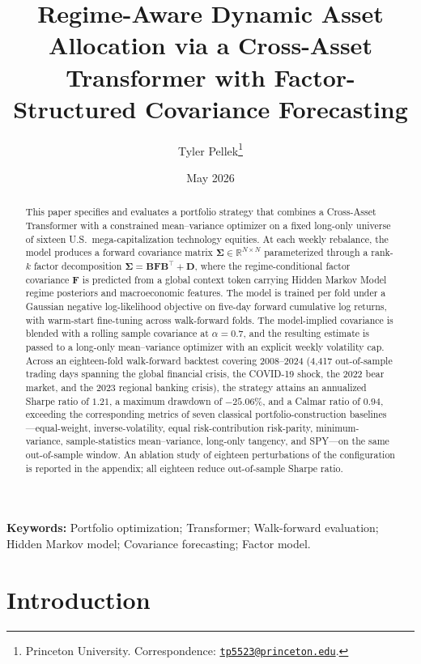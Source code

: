 \documentclass[11pt]{article}
\title{\bfseries Regime-Aware Dynamic Asset Allocation via a Cross-Asset Transformer with Factor-Structured Covariance Forecasting}
\author{Tyler Pellek\thanks{Princeton University. Correspondence: \href{mailto:tp5523@princeton.edu}{\texttt{tp5523@princeton.edu}}.}}
\date{May 2026}
\newcommand{\R}{\mathbb{R}}
\newcommand{\Sig}{\boldsymbol{\Sigma}}
\newcommand{\bB}{\mathbf{B}}
\newcommand{\bF}{\mathbf{F}}
\newcommand{\bD}{\mathbf{D}}
\begin{document}
\maketitle

\begin{abstract}
\noindent
This paper specifies and evaluates a portfolio strategy that combines a
Cross-Asset Transformer with a constrained mean--variance optimizer on a
fixed long-only universe of sixteen U.S.\ mega-capitalization technology
equities. At each weekly rebalance, the model produces a forward
covariance matrix $\Sig \in \R^{N \times N}$ parameterized through a
rank-$k$ factor decomposition $\Sig = \bB \bF \bB^\top + \bD$, where the
regime-conditional factor covariance $\bF$ is predicted from a global
context token carrying Hidden Markov Model regime posteriors and
macroeconomic features. The model is trained per fold under a Gaussian
negative log-likelihood objective on five-day forward cumulative log
returns, with warm-start fine-tuning across walk-forward folds. The
model-implied covariance is blended with a rolling sample covariance at
$\alpha = 0.7$, and the resulting estimate is passed to a long-only
mean--variance optimizer with an explicit weekly volatility cap. Across
an eighteen-fold walk-forward backtest covering 2008--2024 (4,417
out-of-sample trading days spanning the global financial crisis, the
COVID-19 shock, the 2022 bear market, and the 2023 regional banking
crisis), the strategy attains an annualized Sharpe ratio of $1.21$, a
maximum drawdown of $-25.06\%$, and a Calmar ratio of $0.94$, exceeding
the corresponding metrics of seven classical portfolio-construction
baselines---equal-weight, inverse-volatility, equal risk-contribution
risk-parity, minimum-variance, sample-statistics mean--variance,
long-only tangency, and SPY---on the same out-of-sample window. An
ablation study of eighteen perturbations of the configuration is reported
in the appendix; all eighteen reduce out-of-sample Sharpe ratio.
\end{abstract}

\noindent\textbf{Keywords:} Portfolio optimization; Transformer; Walk-forward
evaluation; Hidden Markov model; Covariance forecasting; Factor model.

\section{Introduction}\label{sec:intro}
\end{document}
